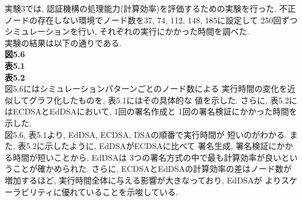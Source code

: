 \indent 実験3では, 認証機構の処理能力(計算効率)を評価するための実験を行った. 
不正ノードの存在しない環境でノード数を37, 74, 112, 148, 185に設定して
250回ずつシミュレーションを行い, それぞれの実行にかかった時間を調べた.\\
\indent 実験の結果は以下の通りである. \\

{\LARGE\textbf{図5.6}}\\
{\LARGE\textbf{表5.1}}\\
{\LARGE\textbf{表5.2}}\\

\indent 図5.6にはシミュレーションパターンごとのノード数による
実行時間の変化を近似してグラフ化したものを, 表5.1にはその具体的な
値を示した. さらに, 表5.2にはECDSAとEdDSAにおいて, 1回の署名作成と
1回の署名検証にかかった時間を示した. \\
\indent 図5.6, 表5.1より, EdDSA, ECDSA, DSAの順番で実行時間が
短いのがわかる. また, 表5.2に示したように, EdDSAがECDSAに比べて
署名生成, 署名検証にかかる時間が短いことから, EdDSAは
3つの署名方式の中で最も計算効率が良いということが確かめられた. 
さらに, ECDSAとEdDSAの計算効率の差はノード数が増加するほど, 
実行時間全体に与える影響が大きなっており, EdDSAが
よりスケーラビリティに優れていることを示唆している. 
